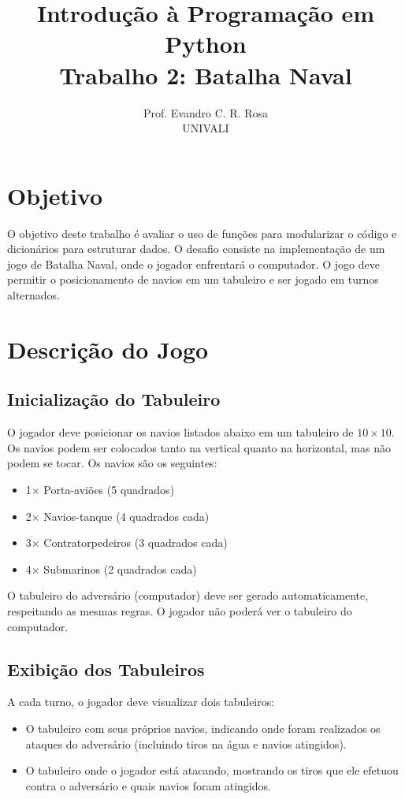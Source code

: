 \documentclass[12pt]{article}
\title{Introdução à Programação em Python\\
\large Trabalho 2: Batalha Naval}
\author{Prof. Evandro C. R. Rosa\\UNIVALI}
\date{}
\begin{document}
\maketitle

\section*{Objetivo}

O objetivo deste trabalho é avaliar o uso de funções para modularizar o código e dicionários para estruturar dados. O desafio consiste na implementação de um jogo de Batalha Naval, onde o jogador enfrentará o computador. O jogo deve permitir o posicionamento de navios em um tabuleiro e ser jogado em turnos alternados.

\section*{Descrição do Jogo}

\subsection*{Inicialização do Tabuleiro}

O jogador deve posicionar os navios listados abaixo em um tabuleiro de $10\times10$. Os navios podem ser colocados tanto na vertical quanto na horizontal, mas não podem se tocar. Os navios são os seguintes:
\begin{itemize}
  \item 1$\times$ Porta-aviões (5 quadrados)
  \item 2$\times$ Navios-tanque (4 quadrados cada)
  \item 3$\times$ Contratorpedeiros (3 quadrados cada)
  \item 4$\times$ Submarinos (2 quadrados cada)
\end{itemize}

O tabuleiro do adversário (computador) deve ser gerado automaticamente, respeitando as mesmas regras. O jogador não poderá ver o tabuleiro do computador.

\subsection*{Exibição dos Tabuleiros}

A cada turno, o jogador deve visualizar dois tabuleiros:
\begin{itemize}
  \item O tabuleiro com seus próprios navios, indicando onde foram realizados os ataques do adversário (incluindo tiros na água e navios atingidos).
  \item O tabuleiro onde o jogador está atacando, mostrando os tiros que ele efetuou contra o adversário e quais navios foram atingidos.
\end{itemize}
\end{document}
